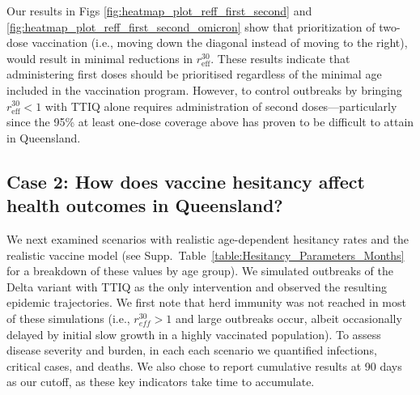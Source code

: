 \documentclass[article, a4, authoryear]{elsarticle}
\begin{document}
Our results in Figs \ref{fig:heatmap_plot_reff_first_second} and \ref{fig:heatmap_plot_reff_first_second_omicron} show that prioritization of two-dose vaccination (i.e., moving down the diagonal instead of moving to the right), would result in minimal reductions in $r_\mathrm{eff}^{30}$. These results indicate that administering first doses should be prioritised regardless of the minimal age included in the vaccination program. However, to control outbreaks by bringing $r_\mathrm{eff}^{30}<1$ with TTIQ alone requires administration of second doses---particularly since the 95\% at least one-dose coverage above has proven to be difficult to attain in Queensland. 


\subsection{Case 2: How does vaccine hesitancy affect health outcomes in Queensland?}
\label{subsec:case_ii}
We next examined scenarios with realistic age-dependent hesitancy rates and the realistic vaccine model (see Supp.~Table~\ref{table:Hesitancy_Parameters_Months} for a breakdown of these values by age group). We simulated outbreaks of the Delta variant with TTIQ as the only intervention and observed the resulting epidemic trajectories. We first note that herd immunity was not reached in most of these simulations (i.e., $r_{eff}^{30}>1$ and large outbreaks occur, albeit occasionally delayed by initial slow growth in a highly vaccinated population). To assess disease severity and burden, in each each scenario we quantified infections, critical cases, and deaths. We also chose to report cumulative results at 90 days as our cutoff, as these key indicators take time to accumulate.
\end{document}
